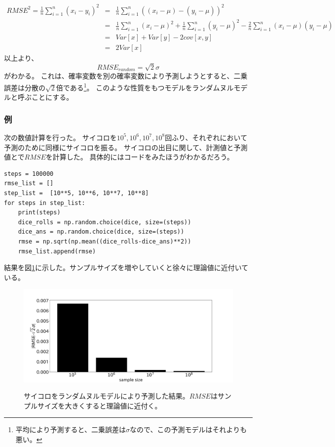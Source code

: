 \begin{eqnarray*}
 RMSE^2=\frac{1}{n}\sum_{i=1}^n (x_i-y_i)^2 &=& \frac{1}{n}\sum_{i=1}^n \left( (x_i-\mu)-(y_i-\mu)\right) ^2\\
 &=& \frac{1}{n}\sum_{i=1}^n (x_i-\mu)^2+\frac{1}{n}\sum_{i=1}^n(y_i-\mu)^2-\frac{2}{n}\sum_{i=1}^n(x_i-\mu)(y_i-\mu) \\
 &=& Var[x]+Var[y]-2cov[x,y] \\
 &=& 2Var[x]
\end{eqnarray*}
 以上より、
\begin{equation*}
 RMSE_{random} = \sqrt{2}\sigma
\end{equation*}
がわかる。
これは、確率変数を別の確率変数により予測しようとすると、二乗誤差は分散の$\sqrt{2}$倍である\footnote{平均により予測すると、二乗誤差は$\sigma$なので、この予測モデルはそれよりも悪い。}。
このような性質をもつモデルをランダムヌルモデルと呼ぶことにする。

\subsubsection{例}
次の数値計算を行った。
サイコロを$10^5,10^6,10^7,10^8$回ふり、それぞれにおいて予測のために同様にサイコロを振る。
サイコロの出目に関して、計測値と予測値とで$RMSE$を計算した。
具体的にはコードをみたほうがわかるだろう。

\begin{lstlisting}
steps = 100000
rmse_list = []
step_list =  [10**5, 10**6, 10**7, 10**8]
for steps in step_list:
    print(steps)
    dice_rolls = np.random.choice(dice, size=(steps))
    dice_ans = np.random.choice(dice, size=(steps))
    rmse = np.sqrt(np.mean((dice_rolls-dice_ans)**2))
    rmse_list.append(rmse)
\end{lstlisting}

結果を図\ref{fig:random_hit}に示した。サンプルサイズを増やしていくと徐々に理論値に近付いている。
\begin{figure}
 \begin{center}
  \includegraphics[width=15cm]{./image/12_/random_hit.pdf}
  \label{fig:random_hit}
  \caption{サイコロをランダムヌルモデルにより予測した結果。$RMSE$はサンプルサイズを大きくすると理論値に近付く。}
 \end{center}
\end{figure}

